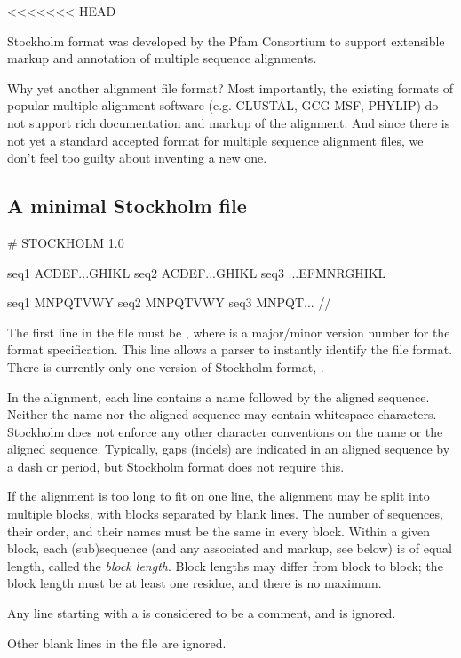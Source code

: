 <<<<<<< HEAD

Stockholm format was developed by the Pfam Consortium to support
extensible markup and annotation of multiple sequence alignments.

Why yet another alignment file format?  Most importantly, the existing
formats of popular multiple alignment software (e.g. CLUSTAL, GCG MSF,
PHYLIP) do not support rich documentation and markup of the
alignment. And since there is not yet a standard accepted format for
multiple sequence alignment files, we don't feel too guilty about
inventing a new one.

\subsection{A minimal Stockholm file}
\begin{cchunk}
# STOCKHOLM 1.0

seq1  ACDEF...GHIKL
seq2  ACDEF...GHIKL
seq3  ...EFMNRGHIKL

seq1  MNPQTVWY
seq2  MNPQTVWY
seq3  MNPQT...
//
\end{cchunk}

The first line in the file must be , where
 is a major/minor version number for the format
specification. This line allows a parser to instantly identify the
file format. There is currently only one version of Stockholm format,
.

In the alignment, each line contains a name followed by the aligned
sequence. Neither the name nor the aligned sequence may contain
whitespace characters. Stockholm does not enforce any other character
conventions on the name or the aligned sequence. Typically, gaps
(indels) are indicated in an aligned sequence by a dash or period, but
Stockholm format does not require this.

If the alignment is too long to fit on one line, the alignment may be
split into multiple blocks, with blocks separated by blank lines. The
number of sequences, their order, and their names must be the same in
every block. Within a given block, each (sub)sequence (and any
associated  and  markup, see below) is of
equal length, called the \emph{block length}. Block lengths may differ
from block to block; the block length must be at least one residue,
and there is no maximum.

Any line starting with a \ccode{\#} is considered to be a comment, and
is ignored.

Other blank lines in the file are ignored. 

